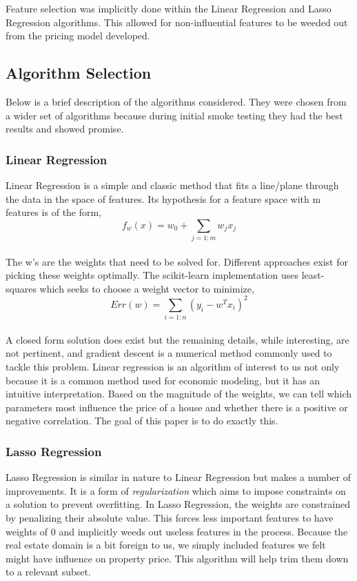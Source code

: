 \documentclass{acm_proc_article-sp}
\begin{document}
	Feature selection was implicitly done within the Linear Regression and Lasso Regression algorithms. This allowed for non-influential features to be weeded out from the pricing model developed.
	
\subsection{Algorithm Selection}
	Below is a brief description of the algorithms considered. They were chosen from a wider set of algorithms because during initial smoke testing they had the best results and showed promise. 
	
\subsubsection{Linear Regression}
	Linear Regression is a simple and classic method that fits a line/plane through the data in the space of features. Its hypothesis for a feature space with m features is of the form, \\
	\[  f_{w}(x) = w_{0}  + \sum_{j=1:m}w_{j}x_{j} \] \\

	The w's are the weights that need to be solved for. Different approaches exist for picking these weights optimally. The scikit-learn implementation uses least-squares which seeks to choose a weight vector to minimize,
	\[ Err(w)  = \sum_{i=1:n}(y_{i} - w^{T}x_{i})^{2}\] \\
	
	A closed form solution does exist but the remaining details, while interesting, are not pertinent, and gradient descent is a numerical method commonly used to tackle this problem. Linear regression is an algorithm of interest to us not only because it is a common method used for economic modeling, but it has an intuitive interpretation. Based on the magnitude of the weights, we can tell which parameters most influence the price of a house and whether there is a positive or negative correlation. The goal of this paper is to do exactly this.
	
\subsubsection{Lasso Regression}
	Lasso Regression is similar in nature to Linear Regression but makes a number of improvements. It is a form of \emph{regularization} which aims to impose constraints on a solution to prevent overfitting. In Lasso Regression, the weights are constrained by penalizing their absolute value. This forces less important features to have weights of 0 and implicitly weeds out useless features in the process. Because the real estate domain is a bit foreign to us, we simply included features we felt might have influence on property price. This algorithm will help trim them down to a relevant subset.
	
\end{document}
